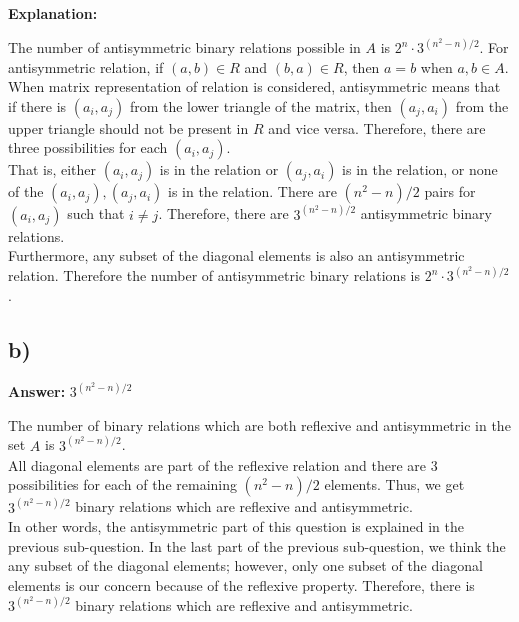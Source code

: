 \documentclass[12pt]{article}
\begin{document}
\begin{tcolorbox}
\textbf{Explanation:}

The number of antisymmetric binary relations possible in $A$ is $2^n \cdot 3^{(n^2 - n)/2}$. For antisymmetric relation, if $(a, b) \in R$ and $(b, a) \in R$, then $a = b$ when $a, b \in A$.\\ 

When matrix representation of relation is considered, antisymmetric means that if there is $(a_i, a_j)$ from the lower triangle of the matrix, then $(a_j, a_i)$ from the upper triangle should not be present in $R$ and vice versa. Therefore, there are three possibilities for each $(a_i, a_j)$.\\

That is, either $(a_i, a_j)$ is in the relation or $(a_j, a_i)$ is in the relation, or none of the $(a_i, a_j), (a_j, a_i)$ is in the relation. There are $(n^2 - n)/2$ pairs for $(a_i, a_j)$ such that $i \neq j$. Therefore, there are $3^{(n^2 - n)/2}$ antisymmetric binary relations.\\

Furthermore, any subset of the diagonal elements is also an antisymmetric relation. Therefore the number of antisymmetric binary relations is $2^n \cdot 3^{(n^2 - n)/2}$.
\end{tcolorbox}

\subsection*{b)}

\textbf{Answer:} $3^{(n^2 - n)/2}$

\begin{tcolorbox}
The number of binary relations which are both reflexive and antisymmetric in the
set $A$ is $3^{(n^2 - n)/2}$.\\

All diagonal elements are part of the reflexive relation and there are 3 possibilities for each of the remaining $(n^2 - n)/2$ elements. Thus, we get $3^{(n^2 - n)/2}$ binary relations which are
reflexive and antisymmetric.\\

In other words, the antisymmetric part of this question is explained in the previous sub-question. In the last part of the previous sub-question, we think the any subset of the diagonal elements; however, only one subset of the diagonal elements is our concern because of the reflexive property. Therefore, there is $3^{(n^2 - n)/2}$ binary relations which are reflexive and antisymmetric.
\end{tcolorbox}
\end{document}
